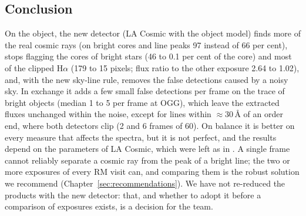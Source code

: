 \subsection{Conclusion}
\label{sec:cr_conclusion}
On the object, the new detector (LA Cosmic with the object model) finds more of the real cosmic rays (on bright cores and line peaks 97 instead of 66 per
cent), stops flagging the cores of bright stars (46 to 0.1 per cent of the core) and most of the clipped H$\alpha$ (179 to 15
pixels; flux ratio to the other exposure 2.64 to 1.02), and, with the new sky-line rule, removes the false detections caused by a noisy sky. In exchange it adds a few small false
detections per frame on the trace of bright objects (median 1 to 5 per frame at OGG), which leave the extracted fluxes unchanged
within the noise, except for lines within $\approx30$\,\AA{} of an order end, where both detectors clip (2 and 6 frames of
60). On balance it is better on every measure that affects the spectra, but it is not perfect, and the results depend
on the parameters of LA Cosmic, which were left as in \banzai{}. A single frame cannot reliably separate a cosmic ray
from the peak of a bright line; the two or more exposures of every RM visit can, and comparing them is the robust
solution we recommend (Chapter~\ref{sec:recommendations}). We have not re-reduced the products with the new detector:
that, and whether to adopt it before a comparison of exposures exists, is a decision for the team.

